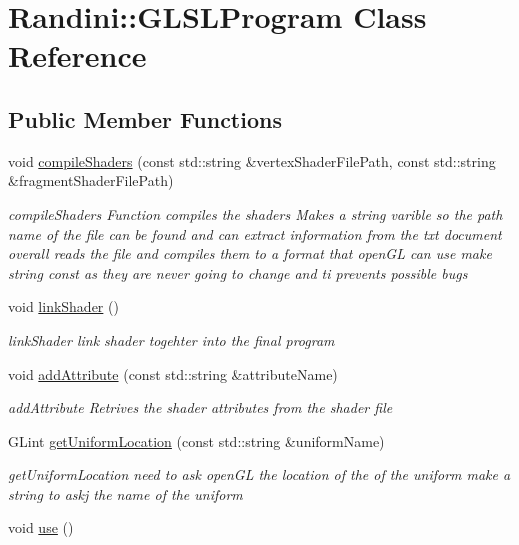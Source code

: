 \hypertarget{classRandini_1_1GLSLProgram}{
\section{Randini::GLSLProgram Class Reference}
\label{classRandini_1_1GLSLProgram}
}
\subsection*{Public Member Functions}
\begin{DoxyCompactItemize}
\item 
void \hyperlink{classRandini_1_1GLSLProgram_a73328c415caa63862b713bb840b85532}{compileShaders} (const std::string \&vertexShaderFilePath, const std::string \&fragmentShaderFilePath)
\begin{DoxyCompactList}\small\item\em compileShaders Function compiles the shaders Makes a string varible so the path name of the file can be found and can extract information from the txt document overall reads the file and compiles them to a format that openGL can use make string const as they are never going to change and ti prevents possible bugs \item\end{DoxyCompactList}\item 
\hypertarget{classRandini_1_1GLSLProgram_aa67b3edb1c8eae84dc65d5e913e144cd}{
void \hyperlink{classRandini_1_1GLSLProgram_aa67b3edb1c8eae84dc65d5e913e144cd}{linkShader} ()}
\label{classRandini_1_1GLSLProgram_aa67b3edb1c8eae84dc65d5e913e144cd}

\begin{DoxyCompactList}\small\item\em linkShader link shader togehter into the final program \item\end{DoxyCompactList}\item 
void \hyperlink{classRandini_1_1GLSLProgram_ad623f8c42dfa974c7820949905a53d18}{addAttribute} (const std::string \&attributeName)
\begin{DoxyCompactList}\small\item\em addAttribute Retrives the shader attributes from the shader file \item\end{DoxyCompactList}\item 
GLint \hyperlink{classRandini_1_1GLSLProgram_a8ed1430de4e2629d6dcddf8eafd6ce09}{getUniformLocation} (const std::string \&uniformName)
\begin{DoxyCompactList}\small\item\em getUniformLocation need to ask openGL the location of the of the uniform make a string to askj the name of the uniform \item\end{DoxyCompactList}\item 
\hypertarget{classRandini_1_1GLSLProgram_a7371ee6e41ba0d03a61663d67551da48}{
void \hyperlink{classRandini_1_1GLSLProgram_a7371ee6e41ba0d03a61663d67551da48}{use} ()}
\label{classRandini_1_1GLSLProgram_a7371ee6e41ba0d03a61663d67551da48}


\end{DoxyCompactItemize}
